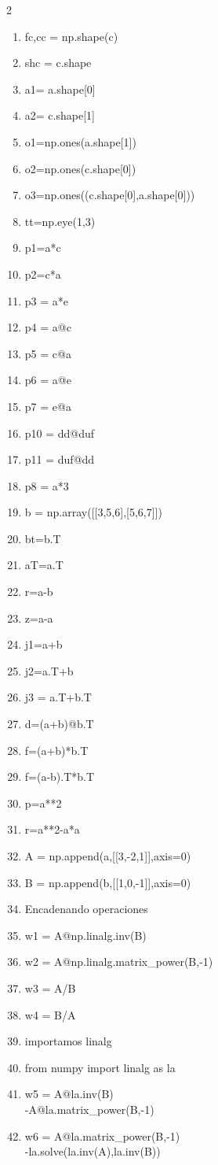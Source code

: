 \begin{enumerate}
\begin{multicols}{2}
{\begin{enumerate}
\item fc,cc = np.shape(c)
\item shc = c.shape
\item a1= a.shape[0]
\item a2= c.shape[1]
\item o1=np.ones(a.shape[1])
\item o2=np.ones(c.shape[0])
\item o3=np.ones((c.shape[0],a.shape[0]))
\item tt=np.eye(1,3)
\item p1=a*c
\item p2=c*a
\item p3 = a*e
\item p4 = a@c
\item p5 = c@a
\item p6 = a@e
\item p7 = e@a
\item p10 = dd@duf
\item p11 = duf@dd
\item p8 = a*3
\item b = np.array([[3,5,6],[5,6,7]])
\item bt=b.T
\item aT=a.T
\item r=a-b
\item z=a-a
\item j1=a+b
\item j2=a.T+b
\item j3 = a.T+b.T
\item d=(a+b)@b.T
\item f=(a+b)*b.T
\item f=(a-b).T*b.T
\item p=a**2
\item r=a**2-a*a
\item A = np.append(a,[[3,-2,1]],axis=0)
\item B = np.append(b,[[1,0,-1]],axis=0)
\item[*] Encadenando operaciones
\item w1 = A@np.linalg.inv(B)
\item w2 = A@np.linalg.matrix\_power(B,-1)
\item w3 = A/B
\item w4 = B/A
\item[*] importamos linalg
\item from numpy import linalg as la
\item w5 = A@la.inv(B) \\ -A@la.matrix\_power(B,-1)
\item w6 = A@la.matrix\_power(B,-1)\\-la.solve(la.inv(A),la.inv(B))

\end{enumerate}}
\end{multicols}
\end{enumerate}
